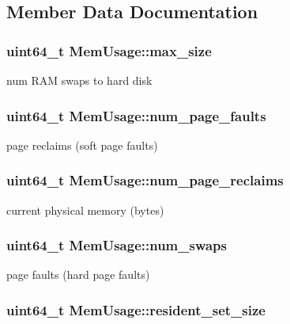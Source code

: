 \subsection{Member Data Documentation}
\hypertarget{structMemUsage_a3607fbd80c1b4b7b156aab8fb41605b8}{
\subsubsection[{max\+\_\+size}]{\setlength{\rightskip}{0pt plus 5cm}uint64\+\_\+t Mem\+Usage\+::max\+\_\+size}}\label{structMemUsage_a3607fbd80c1b4b7b156aab8fb41605b8}
num R\+A\+M swaps to hard disk \hypertarget{structMemUsage_aea2abd0b56172239f29b73fdd93d11d8}{
\subsubsection[{num\+\_\+page\+\_\+faults}]{\setlength{\rightskip}{0pt plus 5cm}uint64\+\_\+t Mem\+Usage\+::num\+\_\+page\+\_\+faults}}\label{structMemUsage_aea2abd0b56172239f29b73fdd93d11d8}
page reclaims (soft page faults) \hypertarget{structMemUsage_ace61fbe86233e13fb504a2b3733a26a4}{
\subsubsection[{num\+\_\+page\+\_\+reclaims}]{\setlength{\rightskip}{0pt plus 5cm}uint64\+\_\+t Mem\+Usage\+::num\+\_\+page\+\_\+reclaims}}\label{structMemUsage_ace61fbe86233e13fb504a2b3733a26a4}
current physical memory (bytes) \hypertarget{structMemUsage_aa36d9bec23bcbc858b1d89bfd8aed136}{
\subsubsection[{num\+\_\+swaps}]{\setlength{\rightskip}{0pt plus 5cm}uint64\+\_\+t Mem\+Usage\+::num\+\_\+swaps}}\label{structMemUsage_aa36d9bec23bcbc858b1d89bfd8aed136}
page faults (hard page faults) \hypertarget{structMemUsage_aee7c0f91294b9ec344191ca5085110f3}{
\subsubsection[{resident\+\_\+set\+\_\+size}]{\setlength{\rightskip}{0pt plus 5cm}uint64\+\_\+t Mem\+Usage\+::resident\+\_\+set\+\_\+size}}\label{structMemUsage_aee7c0f91294b9ec344191ca5085110f3}
